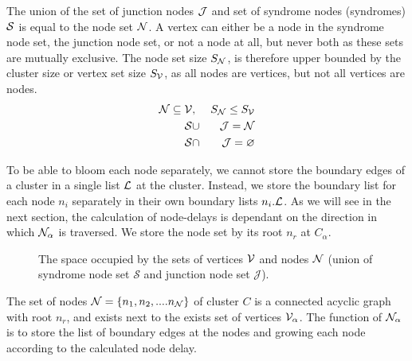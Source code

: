 The union of the set of junction nodes $\mathcal{J}$ and set of syndrome nodes (syndromes) $\mathcal{S}$ is equal to the node set $\mathcal{N}$. A vertex can either be a node in the syndrome node set, the junction node set, or not a node at all, but never both as these sets are mutually exclusive. The node set size $S_{\mathcal{N}}$, is therefore upper bounded by the cluster size or vertex set size $S_{\mathcal{V}}$, as all nodes are vertices, but not all vertices are nodes.
\begin{eqnarray}
  \mathcal{N} \subseteq \mathcal{V} &,& S_{\mathcal{N}} \leq S_{\mathcal{V}}  \\
  \nonumber \mathcal{S} &\cup& \mathcal{J} = \mathcal{N} \\
  \nonumber \mathcal{S} &\cap& \mathcal{J} = \varnothing
\end{eqnarray}

To be able to bloom each node separately, we cannot store the boundary edges of a cluster in a single list $\mathcal{L}$ at the cluster. Instead, we store the boundary list for each node $n_i$ separately in their own boundary lists $n_i.\mathcal{L}$. As we will see in the next section, the calculation of node-delays is dependant on the direction in which $\mathcal{N}_\alpha$ is traversed. We store the node set by its root $n_r$ at $C_\alpha$.

\begin{figure}[h]
  \centering
  \caption{The space occupied by the sets of vertices $\mathcal{V}$ and nodes $\mathcal{N}$ (union of syndrome node set $\mathcal{S}$ and junction node set $\mathcal{J}$).}\label{fig:sets}
\end{figure}

\begin{theorem}
  The set of nodes $\mathcal{N} = \{n_1, n_2, .... n_{\mathcal{N}}\}$ of cluster $C$ is a connected acyclic graph with root $n_r$, and exists next to the exists set of vertices $\mathcal{V}_\alpha$. The function of $\mathcal{N}_\alpha$ is to store the list of boundary edges at the nodes and growing each node according to the calculated node delay.
\end{theorem}


